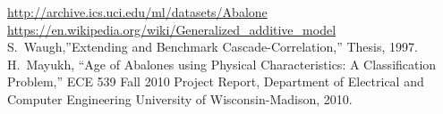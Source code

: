 \documentclass[10pt, paper=a4]{article}
\begin{document}

\begin{thebibliography}{10}
 \url{http://archive.ics.uci.edu/ml/datasets/Abalone}
 \url{https://en.wikipedia.org/wiki/Generalized_additive_model}
 S.~Waugh,''Extending and Benchmark
  Cascade-Correlation,'' Thesis, 1997.
 H.~Mayukh, ``Age of Abalones using Physical
  Characteristics: A Classification Problem,'' ECE 539 Fall 2010
  Project Report, Department of Electrical and Computer Engineering
  University of Wisconsin-Madison, 2010.
\end{thebibliography}
\end{document}

